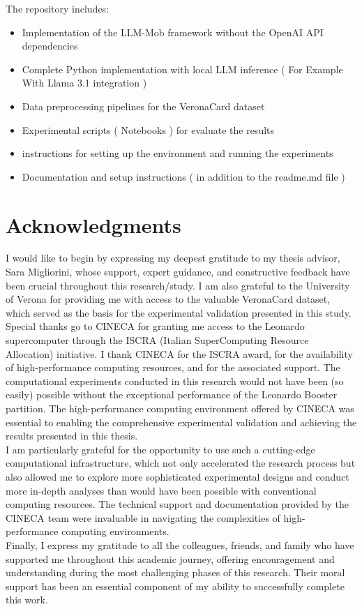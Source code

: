 \documentclass[12pt,a4paper]{article}
\begin{document}
The repository includes:
\begin{itemize}
\item Implementation of the LLM-Mob framework without the OpenAI API dependencies    
\item Complete Python implementation with local LLM inference ( For Example With Llama 3.1 integration )
\item Data preprocessing pipelines for the VeronaCard dataset
\item Experimental scripts ( Notebooks ) for evaluate the results
\item instructions for setting up the environment and running the experiments
\item Documentation and setup instructions ( in addition to the readme.md file )
\end{itemize}

\section{Acknowledgments}

I would like to begin by expressing my deepest gratitude to my thesis advisor, Sara Migliorini, whose support, expert guidance, and constructive feedback have been crucial throughout this research/study. I am also grateful to the University of Verona for providing me with access to the valuable VeronaCard dataset, which served as the basis for the experimental validation presented in this study.\\

Special thanks go to CINECA for granting me access to the Leonardo supercomputer through the ISCRA (Italian SuperComputing Resource Allocation) initiative. I thank CINECA for the ISCRA award, for the availability of high-performance computing resources, and for the associated support. The computational experiments conducted in this research would not have been (so easily) possible without the exceptional performance of the Leonardo Booster partition. The high-performance computing environment offered by CINECA was essential to enabling the comprehensive experimental validation and achieving the results presented in this thesis.\\

I am particularly grateful for the opportunity to use such a cutting-edge computational infrastructure, which not only accelerated the research process but also allowed me to explore more sophisticated experimental designs and conduct more in-depth analyses than would have been possible with conventional computing resources. The technical support and documentation provided by the CINECA team were invaluable in navigating the complexities of high-performance computing environments.\\

Finally, I express my gratitude to all the colleagues, friends, and family who have supported me throughout this academic journey, offering encouragement and understanding during the most challenging phases of this research. Their moral support has been an essential component of my ability to successfully complete this work.\\



\end{document}
